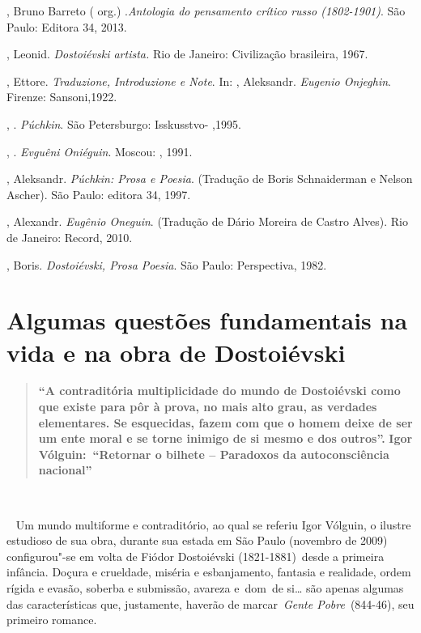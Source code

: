 , Bruno Barreto ( org.) .\emph{Antologia do pensamento crítico
russo (1802-1901)}. São Paulo: Editora 34, 2013.

, Leonid. \emph{Dostoiévski artista.} Rio de Janeiro:
Civilização brasileira, 1967.

, Ettore. \emph{Traduzione, Introduzione e Note}. In: ,
Aleksandr. \emph{Eugenio Onjeghin}. Firenze: Sansoni,1922.

, . \emph{Púchkin}. São Petersburgo: Isskusstvo- ,1995.

, . \emph{Evguêni Oniéguin}. Moscou: , 1991.

, Aleksandr. \emph{Púchkin: Prosa e Poesia}. (Tradução de Boris
Schnaiderman e Nelson Ascher). São Paulo: editora 34, 1997.

, Alexandr. \emph{Eugênio Oneguin}. (Tradução de Dário Moreira
de Castro Alves). Rio de Janeiro: Record, 2010.

, Boris. \emph{Dostoiévski, Prosa Poesia}. São Paulo:
Perspectiva, 1982.

\chapter{Algumas questões fundamentais na vida e na obra de Dostoiévski}

\begin{quote}
\textbf{``A contraditória multiplicidade do mundo de Dostoiévski como
que existe para pôr à prova, no mais alto grau, as verdades elementares.
Se esquecidas, fazem com que o homem deixe de ser um ente moral e se
torne inimigo de si mesmo e dos outros''.} \textbf{Igor
Vólguin:~``Retornar o bilhete -- Paradoxos da autoconsciência
nacional''~}
\end{quote}

\textbf{~}

~ Um mundo multiforme e contraditório, ao qual se referiu Igor Vólguin,
o ilustre estudioso de sua obra, durante sua estada em São Paulo
(novembro de 2009) configurou"-se em volta de Fiódor Dostoiévski
(1821-1881)~desde a primeira infância. Doçura e crueldade, miséria e
esbanjamento, fantasia e realidade, ordem rígida e evasão, soberba e
submissão, avareza e~dom~de si\ldots{} são apenas algumas das características
que, justamente, haverão de marcar~\emph{Gente Pobre}~(844-46), seu
primeiro romance.


